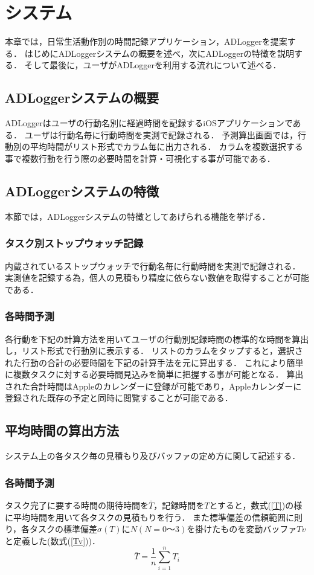 \chapter{システム}
本章では，日常生活動作別の時間記録アプリケーション，ADLoggerを提案する．
はじめにADLoggerシステムの概要を述べ，次にADLoggerの特徴を説明する．
そして最後に，ユーザがADLoggerを利用する流れについて述べる．

\section{ADLoggerシステムの概要}
ADLoggerはユーザの行動名別に経過時間を記録するiOSアプリケーションである．
ユーザは行動名毎に行動時間を実測で記録される．
予測算出画面では，行動別の平均時間がリスト形式でカラム毎に出力される．
カラムを複数選択する事で複数行動を行う際の必要時間を計算・可視化する事が可能である．

\section{ADLoggerシステムの特徴}
本節では，ADLoggerシステムの特徴としてあげられる機能を挙げる．

\subsection{タスク別ストップウォッチ記録}
内蔵されているストップウォッチで行動名毎に行動時間を実測で記録される．
実測値を記録する為，個人の見積もり精度に依らない数値を取得することが可能である．

\subsection{各時間予測}
各行動を下記の計算方法を用いてユーザの行動別記録時間の標準的な時間を算出し，リスト形式で行動別に表示する．
リストのカラムをタップすると，選択された行動の合計の必要時間を下記の計算手法を元に算出する．
これにより簡単に複数タスクに対する必要時間見込みを簡単に把握する事が可能となる．
算出された合計時間はAppleのカレンダーに登録が可能であり，Appleカレンダーに登録された既存の予定と同時に閲覧することが可能である．


\section{平均時間の算出方法}
システム上の各タスク毎の見積もり及びバッファの定め方に関して記述する．
\subsection{各時間予測}
タスク完了に要する時間の期待時間を$\bar{T}$，記録時間を$T$とすると，数式(\ref{T})の様に平均時間を用いて各タスクの見積もりを行う．
また標準偏差の信頼範囲に則り，各タスクの標準偏差$\sigma (T)$に$N (N=0〜3)$を掛けたものを変動バッファ$Tv$と定義した(数式(\ref{Tv}))．
\begin{equation}
\label{T}
\bar{T}=\frac{1}{n}\displaystyle\sum_{i=1}^{n}T_{i}
\end{equation}

